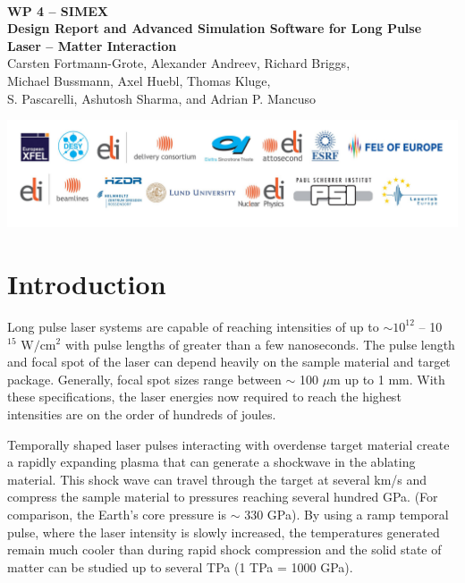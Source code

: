 \documentclass[12pt]{scrartcl}
\begin{document}
\makeatletter
\begin{titlepage}
\thispagestyle{scrheadings}
\begin{center}
$~$\\
\vspace{2cm}
\Huge{\textbf{WP 4 -- SIMEX\\[1cm]
Design Report and Advanced Simulation Software for Long Pulse Laser -- Matter Interaction}}\\[5mm]
\vspace{2cm}
\large{
Carsten Fortmann-Grote, Alexander Andreev, Richard Briggs,\\ Michael Bussmann,
  Axel Huebl, Thomas Kluge,\\
 S. Pascarelli, Ashutosh Sharma, and Adrian P. Mancuso\\
 }
\vspace{1cm}
\@date
\end{center}
\vfill%
\includegraphics[width=\textwidth]{./PartnerLogos.pdf}
\normalfont
\end{titlepage}
\makeatother

\section{Introduction}
Long pulse laser systems are capable of reaching intensities of up to $\sim 10^{12}$ -- 10$^{15} \text{ W}/\text{cm}^2$ with pulse lengths of greater than a few nanoseconds. The pulse length and focal spot of the laser can depend heavily on the sample material and target package. Generally, focal spot sizes range between $\sim$ 100 $\mu$m up to 1 mm. With these specifications, the laser energies now required to reach the highest intensities are on the order of hundreds of joules.

Temporally shaped laser pulses interacting with overdense target material create a rapidly expanding plasma that
can generate a shockwave in the ablating material. This shock wave can travel through the target at several km/s
and compress the sample material to pressures reaching several hundred GPa. (For comparison, the Earth's core
pressure is $\sim$ 330 GPa). By using a ramp temporal pulse, where the laser intensity is slowly increased, the temperatures generated remain much cooler than during rapid shock compression and the solid state of matter can be studied up to several TPa (1 TPa = 1000 GPa).
\end{document}

